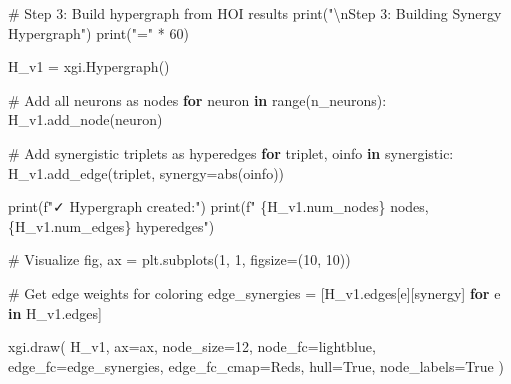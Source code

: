 \documentclass[
  11pt,
  letterpaper,
  oneside,
  openany]{book}
\newenvironment{Shaded}{\begin{snugshade}}{\end{snugshade}}
\newcommand{\BuiltInTok}[1]{\textcolor[rgb]{0.00,0.23,0.31}{#1}}
\newcommand{\CharTok}[1]{\textcolor[rgb]{0.13,0.47,0.30}{#1}}
\newcommand{\CommentTok}[1]{\textcolor[rgb]{0.37,0.37,0.37}{#1}}
\newcommand{\ControlFlowTok}[1]{\textcolor[rgb]{0.00,0.23,0.31}{\textbf{#1}}}
\newcommand{\DecValTok}[1]{\textcolor[rgb]{0.68,0.00,0.00}{#1}}
\newcommand{\KeywordTok}[1]{\textcolor[rgb]{0.00,0.23,0.31}{\textbf{#1}}}
\newcommand{\NormalTok}[1]{\textcolor[rgb]{0.00,0.23,0.31}{#1}}
\newcommand{\OperatorTok}[1]{\textcolor[rgb]{0.37,0.37,0.37}{#1}}
\newcommand{\SpecialCharTok}[1]{\textcolor[rgb]{0.37,0.37,0.37}{#1}}
\newcommand{\SpecialStringTok}[1]{\textcolor[rgb]{0.13,0.47,0.30}{#1}}
\newcommand{\StringTok}[1]{\textcolor[rgb]{0.13,0.47,0.30}{#1}}
\newcommand{\VariableTok}[1]{\textcolor[rgb]{0.07,0.07,0.07}{#1}}
\begin{document}
\begin{Shaded}
\begin{Highlighting}[]
\CommentTok{\# Step 3: Build hypergraph from HOI results}
\BuiltInTok{print}\NormalTok{(}\StringTok{"}\CharTok{\textbackslash{}n}\StringTok{Step 3: Building Synergy Hypergraph"}\NormalTok{)}
\BuiltInTok{print}\NormalTok{(}\StringTok{"="} \OperatorTok{*} \DecValTok{60}\NormalTok{)}

\NormalTok{H\_v1 }\OperatorTok{=}\NormalTok{ xgi.Hypergraph()}

\CommentTok{\# Add all neurons as nodes}
\ControlFlowTok{for}\NormalTok{ neuron }\KeywordTok{in} \BuiltInTok{range}\NormalTok{(n\_neurons):}
\NormalTok{    H\_v1.add\_node(neuron)}

\CommentTok{\# Add synergistic triplets as hyperedges}
\ControlFlowTok{for}\NormalTok{ triplet, oinfo }\KeywordTok{in}\NormalTok{ synergistic:}
\NormalTok{    H\_v1.add\_edge(triplet, synergy}\OperatorTok{=}\BuiltInTok{abs}\NormalTok{(oinfo))}

\BuiltInTok{print}\NormalTok{(}\SpecialStringTok{f"✓ Hypergraph created:"}\NormalTok{)}
\BuiltInTok{print}\NormalTok{(}\SpecialStringTok{f"  }\SpecialCharTok{\{}\NormalTok{H\_v1}\SpecialCharTok{.}\NormalTok{num\_nodes}\SpecialCharTok{\}}\SpecialStringTok{ nodes, }\SpecialCharTok{\{}\NormalTok{H\_v1}\SpecialCharTok{.}\NormalTok{num\_edges}\SpecialCharTok{\}}\SpecialStringTok{ hyperedges"}\NormalTok{)}

\CommentTok{\# Visualize}
\NormalTok{fig, ax }\OperatorTok{=}\NormalTok{ plt.subplots(}\DecValTok{1}\NormalTok{, }\DecValTok{1}\NormalTok{, figsize}\OperatorTok{=}\NormalTok{(}\DecValTok{10}\NormalTok{, }\DecValTok{10}\NormalTok{))}

\CommentTok{\# Get edge weights for coloring}
\NormalTok{edge\_synergies }\OperatorTok{=}\NormalTok{ [H\_v1.edges[e][}\StringTok{\textquotesingle{}synergy\textquotesingle{}}\NormalTok{] }\ControlFlowTok{for}\NormalTok{ e }\KeywordTok{in}\NormalTok{ H\_v1.edges]}

\NormalTok{xgi.draw(}
\NormalTok{    H\_v1,}
\NormalTok{    ax}\OperatorTok{=}\NormalTok{ax,}
\NormalTok{    node\_size}\OperatorTok{=}\DecValTok{12}\NormalTok{,}
\NormalTok{    node\_fc}\OperatorTok{=}\StringTok{\textquotesingle{}lightblue\textquotesingle{}}\NormalTok{,}
\NormalTok{    edge\_fc}\OperatorTok{=}\NormalTok{edge\_synergies,}
\NormalTok{    edge\_fc\_cmap}\OperatorTok{=}\StringTok{\textquotesingle{}Reds\textquotesingle{}}\NormalTok{,}
\NormalTok{    hull}\OperatorTok{=}\VariableTok{True}\NormalTok{,}
\NormalTok{    node\_labels}\OperatorTok{=}\VariableTok{True}
\NormalTok{)}


\end{Highlighting}
\end{Shaded}
\end{document}
